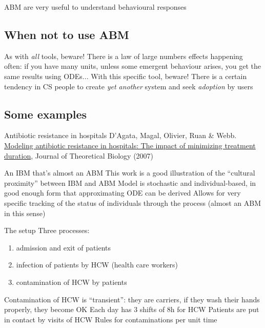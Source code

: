 \documentclass[aspectratio=43]{beamer}
\begin{document}
\begin{frame}{ABM are very useful to understand behavioural responses}
\end{frame} 

\subsection{When not to use ABM}

\begin{frame}{As with \emph{all} tools, beware!}
There is a law of large numbers effects happening often: if you have many units, unless some emergent behaviour arises, you get the same results using ODEs...
\vfill
With this specific tool, beware!
\vfill
There is a certain tendency in CS people to create \emph{yet another} system and seek \emph{adoption} by users
\end{frame}


\subsection{Some examples}

\begin{frame}{Antibiotic resistance in hospitals}
D’Agata, Magal, Olivier, Ruan \& Webb. \href{https://doi.org/10.1016/j.jtbi.2007.08.011}{Modeling antibiotic resistance in hospitals: The impact of minimizing treatment duration}, Journal of Theoretical Biology (2007)
\end{frame} 


\begin{frame}{An IBM that's almost an ABM}
This work is a good illustration of the ``cultural proximity'' between IBM and ABM
\vfill
Model is stochastic and individual-based, in good enough form that approximating ODE can be derived
\vfill
Allows for very specific tracking of the status of individuals through the process (almost an ABM in this sense)
\end{frame} 


\begin{frame}{The setup}
Three processes:
\begin{enumerate}
\item admission and exit of patients
\item infection of patients by HCW (health care workers) 
\item contamination of HCW by patients
\end{enumerate}

\vfill
Contamination of HCW is ``transient'': they are carriers, if they wash their hands properly, they become OK
\vfill
Each day has 3 shifts of 8h for HCW
\vfill
Patients are put in contact by visits of HCW
\vfill
Rules for contaminations per unit time
\end{frame} 
\end{document}
